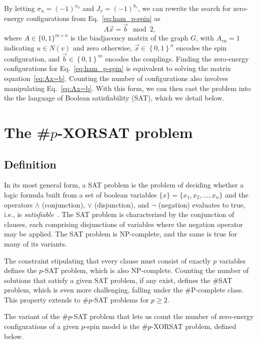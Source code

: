 By letting $\sigma_u = (-1)^{x_u}$ and $J_v = (-1)^{b_v}$, we can rewrite the search for zero-energy configurations from Eq.~\ref{eq:ham_p-spin} as
\begin{equation} \label{eq:Ax=b}
    A\vec{x} = \vec{b} \mod 2,
\end{equation}
where $A \in \{0, 1\}^{m \times n}$ is the biadjacency matrix of the graph $G$, with $A_{vu} = 1$ indicating $u \in N(v)$ and zero otherwise, $\vec{x} \in \left\{ 0,1 \right\}^n$ encodes the spin configuration, and $\vec{b} \in \left\{ 0,1 \right\}^m$ encodes the couplings.
Finding the zero-energy configurations for Eq.~\ref{eq:ham_p-spin} is equivalent to solving the matrix equation~\ref{eq:Ax=b}.
Counting the number of configurations also involves manipulating Eq.~\ref{eq:Ax=b}.
With this form, we can then cast the problem into the the language of Boolean satisfiability (SAT), which we detail below.

\section{The \#\texorpdfstring{$p$}{p}-XORSAT problem}\label{pxorsat_problem}

\subsection{Definition}\label{xorsat_formal_definition}

In its most general form, a SAT problem is the problem of deciding whether a logic formula built from a set of boolean variables $\{x\} = \{x_1, x_2, ..., x_n\}$ and the operators $\wedge$ (conjunction), $\vee$ (disjunction), and $\neg$ (negation) evaluates to true, i.e., is \textit{satisfiable}~\cite{garey1979computers}.
The SAT problem is characterized by the conjunction of clauses, each comprising disjunctions of variables where the negation operator may be applied.
The SAT problem is NP-complete, and the same is true for many of its variants.

The constraint stipulating that every clause must consist of exactly $p$ variables defines the $p$-SAT problem, which is also NP-complete.
Counting the number of solutions that satisfy a given SAT problem, if any exist, defines the \#SAT problem, which is even more challenging, falling under the \#P-complete class.
This property extends to \#$p$-SAT problems for $p \geq 2$.

The variant of the \#$p$-SAT problem that lets us count the number of zero-energy configurations of a given $p$-spin model is the \#$p$-XORSAT problem, defined below.

